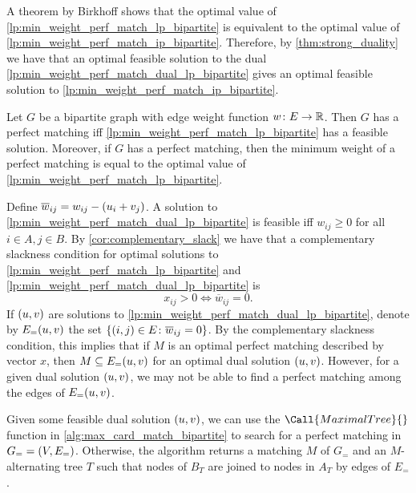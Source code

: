 A theorem by Birkhoff shows that the optimal value of \cref{lp:min_weight_perf_match_lp_bipartite} is equivalent to the 
optimal value of \cref{lp:min_weight_perf_match_ip_bipartite}. Therefore, by \cref{thm:strong_duality} we have that an optimal 
feasible solution to the dual \cref{lp:min_weight_perf_match_dual_lp_bipartite} gives an optimal feasible solution to \cref{lp:min_weight_perf_match_ip_bipartite}.  

\begin{theorem}[Birkhoff]
    Let $G$ be a bipartite graph with edge weight function $w\colon E \to \R$. Then $G$ has a perfect matching iff 
    \cref{lp:min_weight_perf_match_lp_bipartite} has a feasible solution. Moreover, if $G$ has a perfect matching, then the minimum weight 
    of a perfect matching is equal to the optimal value of \cref{lp:min_weight_perf_match_lp_bipartite}.  
    \label{thm:birkhoff}
\end{theorem}

Define $\overline{w}_{ij} = w_{ij} - \lrp{u_i + v_j}$. A solution to \cref{lp:min_weight_perf_match_dual_lp_bipartite} is feasible iff $w_{ij} \geq 0$ for all $i \in A, j \in B$. 
By \cref{cor:complementary_slack} we have that a complementary slackness condition for optimal solutions to \cref{lp:min_weight_perf_match_lp_bipartite} and \cref{lp:min_weight_perf_match_dual_lp_bipartite} is 
\begin{equation}
    x_{ij} > 0 \Longleftrightarrow \overline{w}_{ij} = 0. 
    \label{eq:min_weight_perf_match_slac}
\end{equation}
If $\lrp{u, v}$ are solutions to \cref{lp:min_weight_perf_match_dual_lp_bipartite}, denote by $\f[E_=]{u, v}$ 
the set $\lrc{\lrp{i, j} \in E \colon \overline{w}_{ij} = 0}$. By the complementary slackness condition, this implies that if $M$ is an optimal perfect matching described by vector $x$, 
then $M \sse  \f[E_=]{u, v}$ for an optimal dual solution $\lrp{u, v}$. However, for a given dual solution $\lrp{u, v}$, we may not be able to find a perfect matching among the edges of $\f[E_=]{u, v}$. 

Given some feasible dual solution $\lrp{u, v}$, we can use the $\Call{MaximalTree}{}$ function in \cref{alg:max_card_match_bipartite} to 
search for a perfect matching in $G_= = \lrp{V, E_=}$. 
Otherwise, the algorithm returns a matching $M$ of $G_=$ and an $M$-alternating tree $T$ such that 
nodes of $B_T$ are joined to nodes in $A_T$ by edges of $E_=$. 

